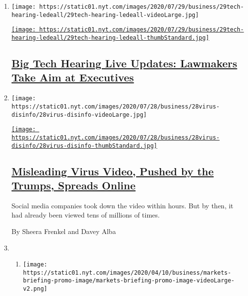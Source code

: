\begin{enumerate}
\def\labelenumi{\arabic{enumi}.}
\item
  \texttt{[image: https://static01.nyt.com/images/2020/07/29/business/29tech-hearing-ledeall/29tech-hearing-ledeall-videoLarge.jpg]}

  \href{https://www.nytimes.com/live/2020/07/29/technology/tech-ceos-hearing-testimony}{\texttt{[image: https://static01.nyt.com/images/2020/07/29/business/29tech-hearing-ledeall/29tech-hearing-ledeall-thumbStandard.jpg]}}

  \hypertarget{big-tech-hearing-live-updates-lawmakers-take-aim-at-executives}{%
  \subsection{\texorpdfstring{\href{https://www.nytimes.com/live/2020/07/29/technology/tech-ceos-hearing-testimony}{Big
  Tech Hearing Live Updates: Lawmakers Take Aim at
  Executives}}{Big Tech Hearing Live Updates: Lawmakers Take Aim at Executives}}\label{big-tech-hearing-live-updates-lawmakers-take-aim-at-executives}}
\item
  \texttt{[image: https://static01.nyt.com/images/2020/07/28/business/28virus-disinfo/28virus-disinfo-videoLarge.jpg]}

  \href{/2020/07/28/technology/virus-video-trump.html}{\texttt{[image: https://static01.nyt.com/images/2020/07/28/business/28virus-disinfo/28virus-disinfo-thumbStandard.jpg]}}

  \hypertarget{misleading-virus-video-pushed-by-the-trumps-spreads-online}{%
  \subsection{\texorpdfstring{\href{/2020/07/28/technology/virus-video-trump.html}{Misleading
  Virus Video, Pushed by the Trumps, Spreads
  Online}}{Misleading Virus Video, Pushed by the Trumps, Spreads Online}}\label{misleading-virus-video-pushed-by-the-trumps-spreads-online}}

  Social media companies took down the video within hours. But by then,
  it had already been viewed tens of millions of times.

  By Sheera Frenkel and Davey Alba
\item
  \begin{enumerate}
  \def\labelenumii{\arabic{enumii}.}
  \item
    \texttt{[image: https://static01.nyt.com/images/2020/04/10/business/markets-briefing-promo-image/markets-briefing-promo-image-videoLarge-v2.png]}


\end{enumerate}
\end{enumerate}
